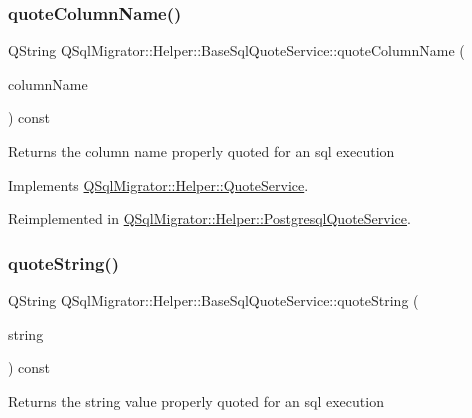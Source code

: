 \subsubsection{\texorpdfstring{quote\+Column\+Name()}{quoteColumnName()}}
{\footnotesize\ttfamily Q\+String Q\+Sql\+Migrator\+::\+Helper\+::\+Base\+Sql\+Quote\+Service\+::quote\+Column\+Name (\begin{DoxyParamCaption}\item[{const Q\+String \&}]{column\+Name }\end{DoxyParamCaption}) const\hspace{0.3cm}{\ttfamily [virtual]}}

\begin{DoxyReturn}{Returns}
the column name properly quoted for an sql execution 
\end{DoxyReturn}


Implements \hyperlink{class_q_sql_migrator_1_1_helper_1_1_quote_service_ae5ed3750bb00609d483996e7baa6f885}{Q\+Sql\+Migrator\+::\+Helper\+::\+Quote\+Service}.



Reimplemented in \hyperlink{class_q_sql_migrator_1_1_helper_1_1_postgresql_quote_service_af54cb8f1749e470e2ea8794fb58896c8}{Q\+Sql\+Migrator\+::\+Helper\+::\+Postgresql\+Quote\+Service}.

\mbox{\label{class_q_sql_migrator_1_1_helper_1_1_base_sql_quote_service_a54146919b3027be887151bcc27c56dad}} 
\subsubsection{\texorpdfstring{quote\+String()}{quoteString()}}
{\footnotesize\ttfamily Q\+String Q\+Sql\+Migrator\+::\+Helper\+::\+Base\+Sql\+Quote\+Service\+::quote\+String (\begin{DoxyParamCaption}\item[{const Q\+String \&}]{string }\end{DoxyParamCaption}) const\hspace{0.3cm}{\ttfamily [virtual]}}

\begin{DoxyReturn}{Returns}
the string value properly quoted for an sql execution 
\end{DoxyReturn}


